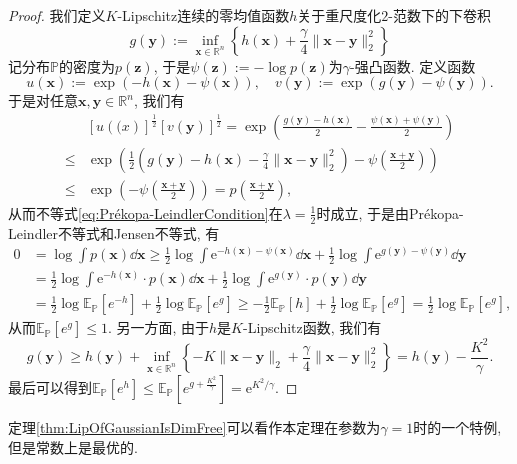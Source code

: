\begin{proof}
	我们定义$K$-Lipschitz连续的零均值函数$h$关于重尺度化$2$-范数下的下卷积
	\begin{equation*}
		g(\bm{y}) 
		:= \inf_{\bm{x} \in \mathbb{R}^n} \left\{ h(\bm{x}) + \frac{\gamma}{4} \|\bm{x} - \bm{y}\|_2^2 \right\}
	\end{equation*}
	记分布$\mathbb{P}$的密度为$p(\bm{z})$, 于是$\psi(\bm{z}) := - \log p(\bm{z})$为$\gamma$-强凸函数. 
	定义函数
	\begin{equation*}
		u(\bm{x}) := \exp(-h(\bm{x}) - \psi(\bm{x})), \quad
		v(\bm{y}) := \exp(g(\bm{y}) - \psi(\bm{y})).  
	\end{equation*}
	于是对任意$\bm{x}, \bm{y} \in \mathbb{R}^n$, 我们有
	\begin{align*}
		&[u(\bm(x)]^{\frac12} [v(\bm{y})]^{\frac12}
		= \exp\left( \frac{g(\bm{y}) - h(\bm{x})}{2} - \frac{\psi(\bm{x}) + \psi(\bm{y})}{2} \right) \\
		\leq & \exp\left( \frac{1}{2} \left( g(\bm{y}) - h(\bm{x}) - \frac{\gamma}{4} \|\bm{x} - \bm{y}\|_2^2 \right) - \psi\left(\frac{\bm{x} + \bm{y}}{2}\right)  \right) \\
		\leq & \exp\left(-\psi\left(\frac{\bm{x} + \bm{y}}{2}\right)\right) 
		= p\left(\frac{\bm{x} + \bm{y}}{2}\right), 
	\end{align*}
	从而不等式\eqref{eq:Prékopa-LeindlerCondition}在$\lambda = \frac{1}{2}$时成立, 于是由Prékopa-Leindler不等式和Jensen不等式, 有
	\begin{align*}
		0 
		&= \log \int p(\bm{x}) \dd \bm{x}
		\geq \frac{1}{2} \log \int \mathrm{e}^{-h(\bm{x}) - \psi(\bm{x})} \dd \bm{x} + \frac{1}{2} \log \int \mathrm{e}^{g(\bm{y}) - \psi(\bm{y})} \dd \bm{y} \\
		&= \frac{1}{2} \log \int \mathrm{e}^{-h(\bm{x})} \cdot p(\bm{x}) \dd \bm{x} + \frac{1}{2} \log \int \mathrm{e}^{g(\bm{y})} \cdot p(\bm{y}) \dd \bm{y} \\
		&= \frac{1}{2} \log \mathbb{E}_{\mathbb{P}}[e^{-h}] + \frac{1}{2} \log \mathbb{E}_{\mathbb{P}}[e^{g}] 
		\geq - \frac{1}{2} \mathbb{E}_{\mathbb{P}}[h] +  \frac{1}{2} \log \mathbb{E}_{\mathbb{P}}[e^{g}]
		=  \frac{1}{2} \log \mathbb{E}_{\mathbb{P}}[e^{g}],  
	\end{align*}
	从而$\mathbb{E}_{\mathbb{P}}[e^{g}] \leq 1$. 
	另一方面, 由于$h$是$K$-Lipschitz函数, 我们有
	\begin{equation*}
		g(\bm{y})
		\geq h(\bm{y}) + \inf_{\bm{x} \in \mathbb{R}^n} \left\{ -K \|\bm{x} - \bm{y}\|_2 + \frac{\gamma}{4} \|\bm{x} - \bm{y}\|_2^2 \right\}
		= h(\bm{y}) - \frac{K^2}{\gamma}. 
	\end{equation*}
	最后可以得到$\mathbb{E}_{\mathbb{P}}[e^h] \leq \mathbb{E}_{\mathbb{P}}[e^{g + \frac{K^2}{\gamma}}] = \mathrm{e}^{K^2 / \gamma}$. 
\end{proof}
\begin{remark}
	定理\ref{thm:LipOfGaussianIsDimFree}可以看作本定理在参数为$\gamma = 1$时的一个特例, 但是常数上是最优的. 
\end{remark}


